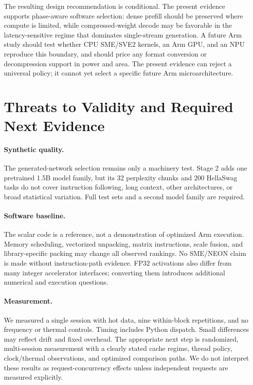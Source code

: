 \documentclass[11pt]{article}
\begin{document}
The resulting design recommendation is conditional. The present evidence supports
phase-aware software selection: dense prefill should be preserved where compute is
limited, while compressed-weight decode may be favorable in the latency-sensitive
regime that dominates single-stream generation. A future Arm study should test
whether CPU SME/SVE2 kernels, an Arm GPU, and an NPU reproduce this boundary, and
should price any format conversion or decompression support in power and area. The
present evidence can reject a universal policy; it cannot yet select a specific
future Arm microarchitecture.

\section{Threats to Validity and Required Next Evidence}
\paragraph{Synthetic quality.}
The generated-network selection remains only a machinery test. Stage 2 adds one
pretrained 1.5B model family, but its 32 perplexity chunks and 200 HellaSwag tasks
do not cover instruction following, long context, other architectures, or broad
statistical variation. Full test sets and a second model family are required.

\paragraph{Software baseline.}
The scalar code is a reference, not a demonstration of optimized Arm execution.
Memory scheduling, vectorized unpacking, matrix instructions, scale fusion, and
library-specific packing may change all observed rankings. No SME/NEON claim is
made without instruction-path evidence. FP32 activations also differ from many
integer accelerator interfaces; converting them introduces additional numerical
and execution questions.

\paragraph{Measurement.}
We measured a single session with hot data, nine within-block repetitions, and no
frequency or thermal controls. Timing includes Python dispatch. Small differences
may reflect drift and fixed overhead. The appropriate next step is randomized,
multi-session measurement with a clearly stated cache regime, thread policy,
clock/thermal observations, and optimized comparison paths. We do not interpret
these results as request-concurrency effects unless independent requests are
measured explicitly.
\end{document}
